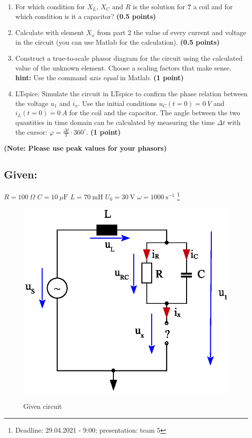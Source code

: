 \documentclass[a4paper]{article}
\newcommand\blfootnote[1]{%
	\begingroup
	\renewcommand\thefootnote{}\footnote{#1}%
	\addtocounter{footnote}{-1}%
	\endgroup
}
\begin{document}
\begin{enumerate}
		\item For which condition for $X_L$, $X_C$ and $R$ is the solution for \textbf{?} a coil and for which condition is it a capacitor? \textbf{(0.5 points)}
		
		\item Calculate with element $X_x$ from part 2 the value of every current and voltage in the circuit (you can use Matlab for the calculation). \textbf{(0.5 points)}
		
		\item Construct a true-to-scale phasor diagram for the circuit using the calculated value of the unknown element. Choose a scaling factors that make sense. 
		\\\textbf{hint:} Use the command \textit{axis equal} in Matlab. \textbf{(1 point)}
		
		\item  LTspice: Simulate the circuit in LTspice to confirm the phase relation between the voltage $u_1$ and $i_x$. Use the initial conditions $u_C(t=0) = 0~V$ and $i_L(t=0) = 0~A$ for the coil and the capacitor. The angle between the two quantities in time domain can be calculated by measuring the time  $\Delta t$ with the cursor: $\varphi = \frac{\Delta t}{T}\cdot 360^\circ$. \textbf{(1 point)}
	\end{enumerate}
	\textbf{(Note: Please use peak values for your phasors)}
\pagebreak
	\subsection*{Given:}
	$R = 100~\Omega$ \qquad $C=10~\mu\text{F}$ \qquad $L = 70~\text{mH}$ \qquad $U_0 = 30~\text{V}$ \qquad $\omega = 1000~\text{s}^{-1}$
	\blfootnote{Deadline: 29.04.2021 - 9:00; presentation: team 5}
	
\begin{figure}[h!]
	\centering
	\includegraphics[scale=0.8]{./Figures/homework5_circuit.eps}
	\label{part1}
	\caption{Given circuit}
\end{figure}
\end{document}
